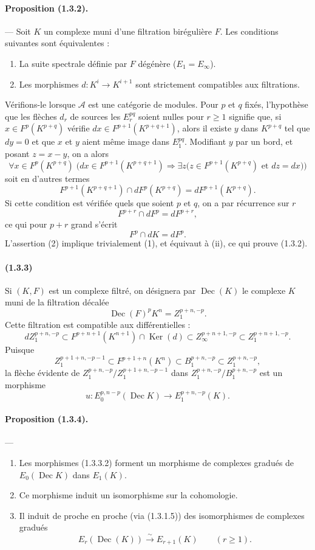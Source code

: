 \documentclass[10pt]{article}
\newcommand{\Ker}{\operatorname{Ker}}
\newcommand{\calA}{\mathcal A}
\newcommand{\iso}{\xrightarrow{\sim}}
\newcommand{\Dec}{\operatorname{Dec}}
\begin{document}
\paragraph{Proposition (1.3.2).} --- Soit $K$ un complexe muni d'une filtration birégulière $F$. Les conditions suivantes sont équivalentes :
\begin{enumerate}[label=(\roman*)]
\item La suite spectrale définie par $F$ dégénère ($E_1=E_\infty$).
\item Les morphismes $d:K^i\to K^{i+1}$ sont strictement compatibles aux filtrations.
\end{enumerate}
Vérifions-le lorsque $\calA$ est une catégorie de modules. Pour $p$ et $q$ fixés, l'hypothèse que les flèches $d_r$ de sources les $E_r^{pq}$ soient nulles pour $r\geq 1$ signifie que, si $x\in F^p(K^{p+q})$ vérifie $dx\in F^{p+1}(K^{p+q+1})$, alors il existe $y$ dans $K^{p+q}$ tel que $dy=0$ et que $x$ et $y$ aient même image dans $E_1^{pq}$. Modifiant $y$ par un bord, et posant $z=x-y$, on a alors
\[
\forall x\in F^p(K^{p+q})\;\bigl(dx\in F^{p+1}(K^{p+q+1})\Rightarrow
\exists z\bigl(z\in F^{p+1}(K^{p+q})\text{ et }dz=dx\bigr)\bigr)
\]
soit en d'autres termes
\[
\tag{1}
F^{p+1}(K^{p+q+1})\cap dF^p(K^{p+q})=dF^{p+1}(K^{p+q}).
\]
Si cette condition est vérifiée quels que soient $p$ et $q$, on a par récurrence sur $r$
\[
F^{p+r}\cap dF^p=dF^{p+r},
\]
ce qui pour $p+r$ grand s'écrit
\[
\tag{2}
F^p\cap dK=dF^p.
\]
L'assertion (2) implique trivialement (1), et équivaut à (ii), ce qui prouve (1.3.2).

\paragraph{(1.3.3)} Si $(K,F)$ est un complexe filtré, on désignera par $\Dec(K)$ le complexe $K$ muni de la filtration décalée
\[
\Dec(F)^pK^n=Z_1^{p+n,-p}.
\]
Cette filtration est compatible aux différentielles :
\[
dZ_1^{p+n,-p}\subset F^{p+n+1}(K^{n+1})\cap\Ker(d)
       \subset Z_\infty^{p+n+1,-p}\subset Z_1^{p+n+1,-p}.
\]
Puisque
\[
\tag{1.3.3.1}
Z_1^{p+1+n,-p-1}\subset F^{p+1+n}(K^n)\subset B_1^{p+n,-p}\subset Z_1^{p+n,-p},
\]
la flèche évidente de $Z_1^{p+n,-p}/Z_1^{p+1+n,-p-1}$ dans $Z_1^{p+n,-p}/B_1^{p+n,-p}$ est un morphisme
\[
\tag{1.3.3.2}
u:E_0^{p,n-p}(\Dec K)\longrightarrow E_1^{p+n,-p}(K).
\]

\paragraph{Proposition (1.3.4).} ---
\begin{enumerate}[label=(\roman*)]
\item Les morphismes (1.3.3.2) forment un morphisme de complexes gradués de $E_0(\Dec K)$ dans $E_1(K)$.
\item Ce morphisme induit un isomorphisme sur la cohomologie.
\item Il induit de proche en proche (via (1.3.1.5)) des isomorphismes de complexes gradués
\[
E_r(\Dec(K))\iso E_{r+1}(K)\qquad(r\ge1).
\]
\end{enumerate}
\end{document}
